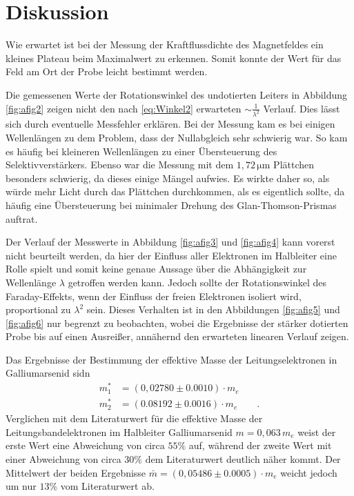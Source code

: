 \section{Diskussion}
Wie erwartet ist bei der Messung der Kraftflussdichte des Magnetfeldes ein kleines Plateau beim Maximalwert zu erkennen. Somit konnte der Wert für das Feld am Ort der Probe leicht bestimmt werden.

Die gemessenen Werte der Rotationswinkel des undotierten Leiters in Abbildung \ref{fig:afig2} zeigen nicht den nach \ref{eq:Winkel2} erwarteten $\sim \frac{1}{\lambda^2}$ Verlauf. Dies lässt sich durch eventuelle Messfehler erklären.
Bei der Messung kam es bei einigen Wellenlängen zu dem Problem, dass der Nullabgleich sehr schwierig war. So kam es häufig bei kleineren Wellenlängen zu einer Übersteuerung des Selektivverstärkers. Ebenso war die Messung mit dem $1,72\,\si{\micro\meter}$
Plättchen besonders schwierig, da dieses einige Mängel aufwies. Es wirkte daher so, als würde mehr Licht durch das Plättchen durchkommen, als es eigentlich sollte, da häufig eine Übersteuerung bei minimaler Drehung des Glan-Thomson-Prismas auftrat.

Der Verlauf der Messwerte in Abbildung \ref{fig:afig3} und \ref{fig:afig4} kann vorerst nicht beurteilt werden, da hier der Einfluss aller Elektronen im Halbleiter eine Rolle spielt und somit keine genaue Aussage über die Abhängigkeit zur Wellenlänge $\lambda$ getroffen werden kann.
Jedoch sollte der Rotationswinkel des Faraday-Effekts, wenn der Einfluss der freien Elektronen isoliert wird, proportional zu $\lambda^2$ sein. Dieses Verhalten ist in den Abbildungen \ref{fig:afig5} und \ref{fig:afig6} nur begrenzt zu beobachten, wobei die Ergebnisse der stärker dotierten Probe
bis auf einen Ausreißer, annähernd den erwarteten linearen Verlauf zeigen.

Das Ergebnisse der Bestimmung der effektive Masse der Leitungselektronen in Galliumarsenid sidn
\begin{align*}
    m_1^{*} &= (0,02780 \pm 0.0010)\cdot m_e \\
    m_2^{*} &= (0.08192 \pm 0.0016)\cdot m_e \qquad .
\end{align*}
Verglichen mit dem Literaturwert für die effektive Masse der Leitungsbandelektronen im Halbleiter Galliumarsenid $m=0,063\, m_e$ \cite{quelle05} weist der erste Wert eine Abweichung von circa $55\%$ auf, während der zweite Wert
mit einer Abweichung von circa $30\%$ dem Literaturwert deutlich näher kommt. Der Mittelwert der beiden Ergebnisse $\bar{m} = (0,05486 \pm 0.0005)\cdot m_e$ weicht jedoch um nur $13\%$ vom Literaturwert ab. 

